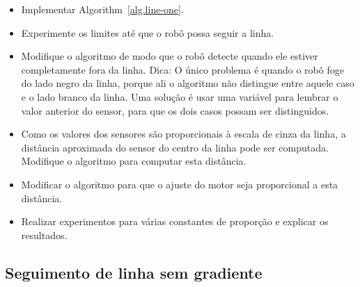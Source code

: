 \begin{framed}
\begin{itemize}
\item Implementar Algorithm~\ref{alg.line-one}.
\item Experimente os limites até que o robô possa seguir a linha.
\item Modifique o algoritmo de modo que o robô detecte quando ele estiver completamente fora da linha. Dica: O único problema é quando o robô foge do lado negro da linha, porque ali o algoritmo não distingue entre aquele caso e o lado branco da linha. Uma solução é usar uma variável para lembrar o valor anterior do sensor, para que os dois casos possam ser distinguidos.
\end{itemize}
\end{framed}

\begin{framed}
\begin{itemize}
\item Como os valores dos sensores são proporcionais à escala de cinza da linha, a distância aproximada do sensor do centro da linha pode ser computada. Modifique o algoritmo para computar esta distância.
\item Modificar o algoritmo para que o ajuste do motor seja proporcional a esta distância.
\item Realizar experimentos para várias constantes de proporção e explicar os resultados.
\end{itemize}
\end{framed}

\subsection{Seguimento de linha sem gradiente}\label{s.no-gradient}

